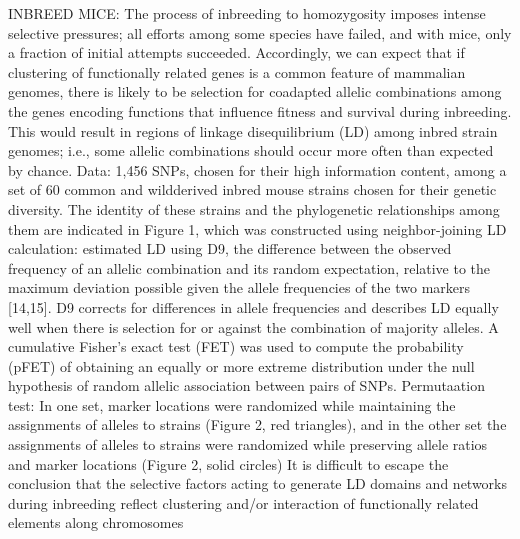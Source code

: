 INBREED MICE: The process of inbreeding to homozygosity imposes intense selective pressures; all efforts among some species have failed, and with mice, only a fraction of initial attempts succeeded.  \cite{petkov2005evidence}
Accordingly, we can expect that if clustering of functionally related genes is a common feature of mammalian genomes, there is likely to be selection for coadapted allelic combinations among the genes encoding functions that influence fitness and survival during inbreeding. This would result in regions of linkage disequilibrium (LD) among inbred strain genomes; i.e., some allelic combinations should occur more often than expected by chance. \cite{petkov2005evidence}
Data: 1,456 SNPs, chosen for their high information content, among a set of 60 common and wildderived inbred mouse strains chosen for their genetic diversity.  \cite{petkov2005evidence}
 The identity of these strains and the phylogenetic relationships among them are indicated in Figure 1, which was constructed using neighbor-joining \cite{petkov2005evidence}
LD calculation: estimated LD using D9, the difference between the observed frequency of an allelic combination and its random expectation, relative to the maximum deviation possible given the allele frequencies of the two markers [14,15]. D9 corrects for differences in allele frequencies and describes LD equally well when there is selection for or against the combination of majority alleles. A cumulative Fisher's exact test (FET) was used to compute the probability (pFET) of obtaining an equally or more extreme distribution under the null hypothesis of random allelic association between pairs of SNPs.  \cite{petkov2005evidence}
Permutaation test: In one set, marker locations were randomized while maintaining the assignments of alleles to strains (Figure 2, red triangles), and in the other set the assignments of alleles to strains were randomized while preserving allele ratios and marker locations (Figure 2, solid circles) \cite{petkov2005evidence}
It is difficult to escape the conclusion that the selective factors acting to generate LD domains and networks during inbreeding reflect clustering and/or interaction of functionally related elements along chromosomes \cite{petkov2005evidence}

